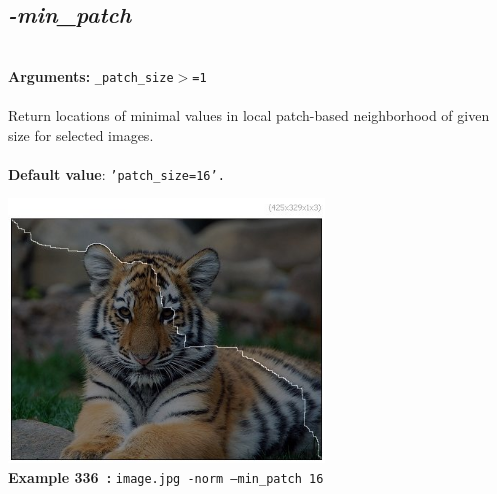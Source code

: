 \documentclass[a4paper,11pt,twoside]{book}
\begin{document}
\subsection{\emph{-min\_patch} }\vspace*{-0.5em}
~\\\textbf{Arguments: } 
{\small \texttt{\_patch\_size$>$=1}}\\~\\
Return locations of minimal values in local patch-based neighborhood of given size for selected images.
~\\~\\\textbf{Default value}: {\small \texttt{'patch\_size=16'.}}
\begin{center}\includegraphics[keepaspectratio=true,height=7cm,width=\textwidth]{img/gmic_def336.jpg}\\
{\footnotesize \textbf{Example 336~:} \texttt{image.jpg -norm --min\_patch 16}}
\end{center}
\end{document}
